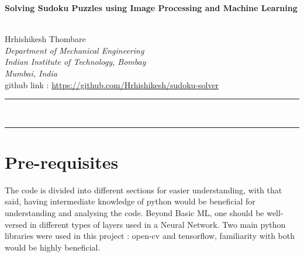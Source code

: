 \documentclass[a4paper,12pt]{article}
\renewenvironment{abstract}
 {\par\noindent\textbf{\abstractname}\ \ignorespaces \\}
 {\par\noindent\medskip}
\begin{document}
\pagestyle{fancy}
\thispagestyle{empty}
\fancyhead[L]{}
\renewcommand*{\thefootnote}{\fnsymbol{footnote}}
\begin{center}
\Large{\textbf{Solving Sudoku Puzzles using Image Processing and Machine Learning}}

\vspace{0.4cm}
\normalsize
\\ Hrhishikesh Thombare \\
\vspace{0.1cm}
\textit{Department of Mechanical Engineering}
\\ \textit{Indian Institute of Technology, Bombay}
\\ \textit{Mumbai, India}
\\ github link : \href{https://github.com/Hrhishikesh/sudoku-solver}{https://github.com/Hrhishikesh/sudoku-solver}
\medskip
\normalsize
\end{center}
{\color{gray}\hrule}
\vspace{0.4cm}
\begin{abstract}

\end{abstract}
{\color{gray}\hrule}
\medskip



\newpage
\twocolumn
\section{Pre-requisites}
The code is divided into different sections for easier understanding, with that said, having intermediate knowledge of python would be beneficial for understanding and analysing the code.
Beyond Basic  ML, one should be well-versed  in  different types of layers used in a Neural Network.
Two main python libraries were used in this project : open-cv and tensorflow, familiarity with both would be highly beneficial.
\end{document}
